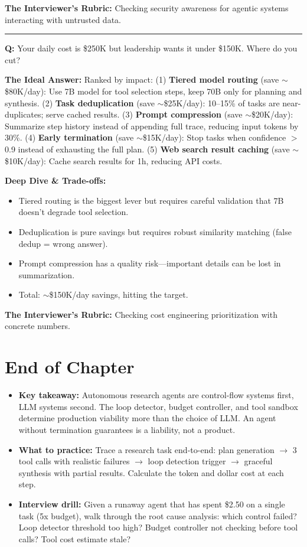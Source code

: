 \textbf{The Interviewer's Rubric:} Checking security awareness for agentic systems interacting with untrusted data.

\bigskip\hrule\bigskip

\textbf{Q:} Your daily cost is \$250K but leadership wants it under \$150K. Where do you cut?

\textbf{The Ideal Answer:} Ranked by impact: (1) \textbf{Tiered model routing} (save $\sim$\$80K/day): Use 7B model for tool selection steps, keep 70B only for planning and synthesis. (2) \textbf{Task deduplication} (save $\sim$\$25K/day): 10--15\% of tasks are near-duplicates; serve cached results. (3) \textbf{Prompt compression} (save $\sim$\$20K/day): Summarize step history instead of appending full trace, reducing input tokens by 30\%. (4) \textbf{Early termination} (save $\sim$\$15K/day): Stop tasks when confidence $>$ 0.9 instead of exhausting the full plan. (5) \textbf{Web search result caching} (save $\sim$\$10K/day): Cache search results for 1h, reducing API costs.

\textbf{Deep Dive \& Trade-offs:}
\begin{itemize}
  \item Tiered routing is the biggest lever but requires careful validation that 7B doesn't degrade tool selection.
  \item Deduplication is pure savings but requires robust similarity matching (false dedup = wrong answer).
  \item Prompt compression has a quality risk---important details can be lost in summarization.
  \item Total: $\sim$\$150K/day savings, hitting the target.
\end{itemize}

\textbf{The Interviewer's Rubric:} Checking cost engineering prioritization with concrete numbers.

\section*{End of Chapter}

\begin{itemize}
  \item \textbf{Key takeaway:} Autonomous research agents are control-flow systems first, LLM systems second. The loop detector, budget controller, and tool sandbox determine production viability more than the choice of LLM. An agent without termination guarantees is a liability, not a product.
  \item \textbf{What to practice:} Trace a research task end-to-end: plan generation $\rightarrow$ 3 tool calls with realistic failures $\rightarrow$ loop detection trigger $\rightarrow$ graceful synthesis with partial results. Calculate the token and dollar cost at each step.
  \item \textbf{Interview drill:} Given a runaway agent that has spent \$2.50 on a single task (5x budget), walk through the root cause analysis: which control failed? Loop detector threshold too high? Budget controller not checking before tool calls? Tool cost estimate stale?
\end{itemize}
